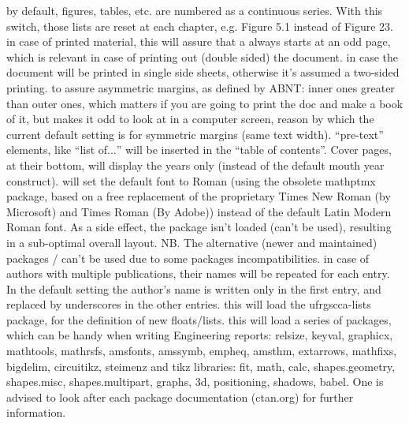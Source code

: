 \documentclass[dctools,english,tocdepth=3,secdepth=3]{ufrgscca} %
\begin{document}
\begin{Options}
	 by default, figures, tables, etc. are numbered as a continuous series. With this switch, those lists are reset at each chapter, e.g. Figure 5.1 instead of Figure 23.
	 in case of printed material, this will assure that a \Macro{\chapter}{} always starts at an odd page, which is relevant in case of printing out (double sided) the document.
	 in case the document will be printed in single side sheets, otherwise it's assumed a two-sided printing.
	 to assure asymmetric margins, as defined by ABNT: inner ones greater than outer ones, which matters if you are going to print the doc and make a book of it, but makes it odd to look at in a computer screen, reason by which the current default setting is for symmetric margins (same text width).
     “pre-text” elements, like “list of$\dots$” will be inserted in the “table of contents”.
     Cover pages, at their bottom, will display the years only (instead of the default mouth year construct).
     will set the default font to Roman (using the obsolete mathptmx package, based on  a free replacement of the proprietary Times New Roman (by Microsoft) and Times Roman (By Adobe)) instead of the default Latin Modern Roman font. As a side effect, the package  isn't loaded (can't be used), resulting in a sub-optimal overall layout. NB. The alternative (newer and maintained) packages / can't be used due to some packages incompatibilities.
	 in case of authors with multiple publications, their names will be repeated for each entry. In the default setting the author's name is written only in the first entry, and replaced by underscores in the other entries.
	 this will load the {\MetaFmt[Pack]\sffamily ufrgscca-lists} package, for the definition of new floats/lists.
	 this will load a series of packages, which can be handy when writing Engineering reports: {\MetaFmt[Pack]\sffamily relsize, keyval, graphicx, mathtools, mathrsfs, amsfonts, amssymb, empheq, amsthm, ext\-arrows, mathfixs, bigdelim, circuitikz, steimenz} and tikz libraries: {\MetaFmt[Pack]\sffamily fit,  math, calc, shapes.geometry, shapes.misc, shapes.multipart, graphs, 3d, positioning, shadows, babel}. One is advised to look after each package documentation (ctan.org) for further information.

\end{Options}
\end{document}
